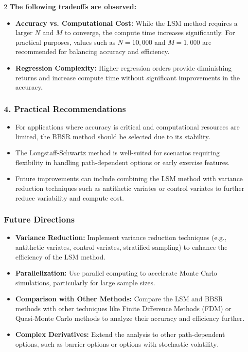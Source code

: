 \begin{multicols}{2}
\textbf{The following tradeoffs are observed:}
\begin{itemize}
    \item \textbf{Accuracy vs. Computational Cost:}  
    While the LSM method requires a larger \(N\) and \(M\) to converge, the compute time increases significantly. For practical purposes, values such as \(N = 10,000\) and \(M = 1,000\) are recommended for balancing accuracy and efficiency.
    
    \item \textbf{Regression Complexity:}  
    Higher regression orders provide diminishing returns and increase compute time without significant improvements in the accuracy.
\end{itemize}

\subsubsection*{4. Practical Recommendations}
\begin{itemize}
    \item For applications where accuracy is critical and computational resources are limited, the BBSR method should be selected due to its stability.
    \item The Longstaff-Schwartz method is well-suited for scenarios requiring flexibility in handling path-dependent options or early exercise features. 
    \item Future improvements can include combining the LSM method with variance reduction techniques such as antithetic variates or control variates to further reduce variability and compute cost.
\end{itemize}

\subsubsection{Future Directions}
\begin{itemize}
    \item \textbf{Variance Reduction:} Implement variance reduction techniques (e.g., antithetic variates, control variates, stratified sampling) to enhance the efficiency of the LSM method.
    \item \textbf{Parallelization:} Use parallel computing to accelerate Monte Carlo simulations, particularly for large sample sizes.
    \item \textbf{Comparison with Other Methods:} Compare the LSM and BBSR methods with other techniques like Finite Difference Methods (FDM) or Quasi-Monte Carlo methods to analyze their accuracy and efficiency further.
    \item \textbf{Complex Derivatives:} Extend the analysis to other path-dependent options, such as barrier options or options with stochastic volatility.
\end{itemize}


\end{multicols}

